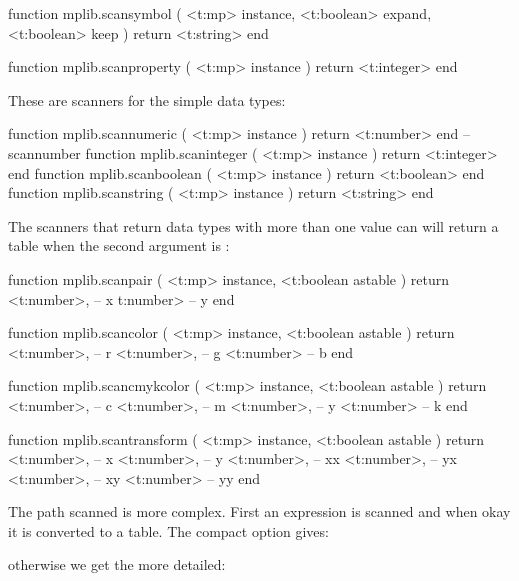 \starttyping[option=LUA]
function mplib.scansymbol ( <t:mp> instance, <t:boolean> expand, <t:boolean> keep )
    return <t:string>
end
\stoptyping

\starttyping[option=LUA]
function mplib.scanproperty ( <t:mp> instance )
    return <t:integer>
end
\stoptyping

These are scanners for the simple data types:

\starttyping[option=LUA]
function mplib.scannumeric ( <t:mp> instance ) return <t:number>  end -- scannumber
function mplib.scaninteger ( <t:mp> instance ) return <t:integer> end
function mplib.scanboolean ( <t:mp> instance ) return <t:boolean> end
function mplib.scanstring  ( <t:mp> instance ) return <t:string>  end
\stoptyping

The scanners that return data types with more than one value can will return a
table when the second argument is :

\starttyping[option=LUA]
function mplib.scanpair ( <t:mp> instance, <t:boolean astable )
    return
        <t:number>, -- x
        t:number>   -- y
end
\stoptyping

\starttyping[option=LUA]
function mplib.scancolor (
    <t:mp>      instance,
    <t:boolean astable
)
    return
        <t:number>, -- r
        <t:number>, -- g
        <t:number>  -- b
end
\stoptyping

\starttyping[option=LUA]
function mplib.scancmykcolor ( <t:mp> instance, <t:boolean astable )
    return
        <t:number>, -- c
        <t:number>, -- m
        <t:number>, -- y
        <t:number>  -- k
end
\stoptyping

\starttyping[option=LUA]
function mplib.scantransform ( <t:mp> instance, <t:boolean astable )
    return
        <t:number>, -- x
        <t:number>, -- y
        <t:number>, -- xx
        <t:number>, -- yx
        <t:number>, -- xy
        <t:number>  -- yy
end
\stoptyping

The path scanned is more complex. First an expression is scanned and when okay
it is converted to a table. The compact option gives:

\stoptyping

otherwise we get the more detailed:

\stoptyping

